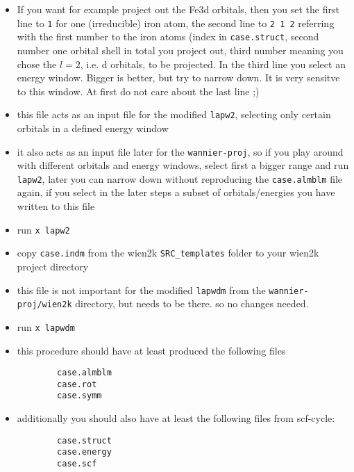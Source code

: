 \documentclass[a4paper,bibtotocnumbered]{scrartcl}
\begin{document}
\begin{itemize}
\begin{verbatim}
	\end{verbatim}
	\item If you want for example project out the Fe3d orbitals, then you set the first line
	to \texttt{1} for one (irreducible) iron atom, the second line to \texttt{2  1  2} referring
	with the first number to the iron atoms (index in \texttt{case.struct}, second
	number one orbital shell in total you project out, third number meaning
	you chose the $l=2$, i.e. d orbitals, to be projected. In the third line you
	select an energy window. Bigger is better, but try to narrow down. It is
	very sensitve to this window. At first do not care about the last line ;)
	\item this file acts as an input file for the modified \texttt{lapw2},
	selecting only certain orbitals in a defined energy window
	\item it also acts as an input file later for the \texttt{wannier-proj}, so if
	you play around with different orbitals and energy windows, select first a
	bigger range and run \texttt{lapw2}, later you can narrow down without
	reproducing the \texttt{case.almblm} file again, if you select in the later
	steps a subset of orbitals/energies you have written to this file
	\item run \texttt{x lapw2}
	\item copy \texttt{case.indm} from the wien2k \texttt{SRC\_templates} folder to
	your wien2k project directory
	\item this file is not important for the modified \texttt{lapwdm} from the
	\texttt{wannier-proj/wien2k} directory, but needs to be there. so no changes needed.
	\item run \texttt{x lapwdm}
	\item this procedure should have at least produced the following files
	\begin{verbatim}
		case.almblm
		case.rot
		case.symm
	\end{verbatim}
	\item additionally you should also have at least the following files from scf-cycle:
	\begin{verbatim}
		case.struct
		case.energy
		case.scf
	\end{verbatim}
	
\end{itemize}
\end{document}
